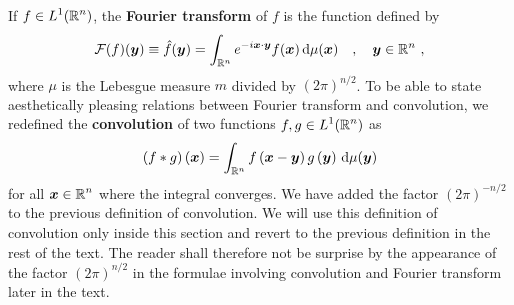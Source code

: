 If $\displaystyle f \in L^1(\mathbb{R}^n)$, the
{\bfseries Fourier transform} of $f$ is the
function defined by
\begin{equation} \label{distr_fourierT}
\F(f)(\VEC{y}) \equiv \hat{f}(\VEC{y}) = \int_{\RR^n} e^{-i \VEC{x}\cdot\VEC{y}}
f(\VEC{x}) \dx{\mu(\VEC{x})} \quad , \quad \VEC{y} \in \RR^n \ ,
\end{equation}
where $\mu$ is the Lebesgue measure $m$ divided by $\displaystyle (2\pi)^{n/2}$.
To be able to state aesthetically pleasing relations between
Fourier transform and convolution, we redefined the
{\bfseries convolution} of
two functions $\displaystyle f,g \in L^1(\mathbb{R}^n)$ as
\[
(f\ast g)\left({\bm{x}}\right) = \int_{\mathbb{R}^n}
f\left({\bm{x}} - {\bm{y}}\right)  g\left({\bm{y}}\right) \,\mathrm{d}{\mu({\bm{y}})}
\]
for all $\displaystyle {\bm{x}} \in \mathbb{R}^n$ where the integral converges.  We have
added the factor $\displaystyle (2\pi)^{-n/2}$ to the previous definition of
convolution.   We will use this definition of convolution only inside
this section and revert to the previous definition in the rest of the
text.  The reader shall therefore not be surprise by the appearance
of the factor $\displaystyle (2\pi)^{n/2}$ in the formulae involving
convolution and Fourier transform later in the text.

